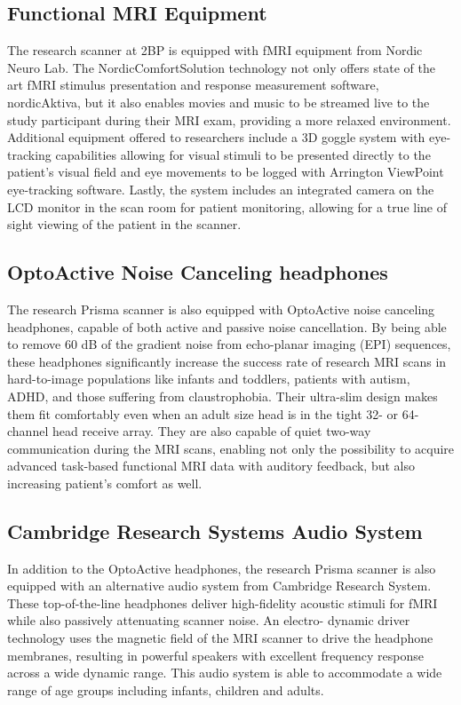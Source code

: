 \documentclass[11pt]{amsart}
\begin{document}
\hypertarget{x-functional-mri-equipment}{\subsection*{Functional MRI Equipment}}
The research scanner at 2BP is equipped with fMRI equipment from Nordic Neuro Lab. The NordicComfortSolution technology not only offers state of the art fMRI stimulus presentation and response measurement software, nordicAktiva, but it also enables movies and music to be streamed live to the study participant during their MRI exam, providing a more relaxed environment. Additional equipment offered to researchers include a 3D goggle system with eye-tracking capabilities allowing for visual stimuli to be presented directly to the patient’s visual field and eye movements to be logged with Arrington ViewPoint eye-tracking software. Lastly, the system includes an integrated camera on the LCD monitor in the scan room for patient monitoring, allowing for a true line of sight viewing of the patient in the scanner.


\hypertarget{x-optoactive-noise-canceling-headphones}{\subsection*{OptoActive Noise Canceling headphones}}
The research Prisma scanner is also equipped with OptoActive noise canceling headphones, capable of both active and passive noise cancellation. By being able to remove 60 dB of the gradient noise from echo-planar imaging (EPI) sequences, these headphones significantly increase the success rate of research MRI scans in hard-to-image populations like infants and toddlers, patients with autism, ADHD, and those suffering from claustrophobia. Their ultra-slim design makes them fit comfortably even when an adult size head is in the tight 32- or 64-channel head receive array. They are also capable of quiet two-way communication during the MRI scans, enabling not only the possibility to acquire advanced task-based functional MRI data with auditory feedback, but also increasing patient’s comfort as well.


\hypertarget{x-cambridge-research-systems-audio-system}{\subsection*{Cambridge Research Systems Audio System}}
In addition to the OptoActive headphones, the research Prisma scanner is also equipped with an alternative audio system from Cambridge Research System. These top-of-the-line headphones deliver high-fidelity acoustic stimuli for fMRI while also passively attenuating scanner noise. An electro- dynamic driver technology uses the magnetic field of the MRI scanner to drive the headphone membranes, resulting in powerful speakers with excellent frequency response across a wide dynamic range. This audio system is able to accommodate a wide range of age groups including infants, children and adults.
\end{document}
